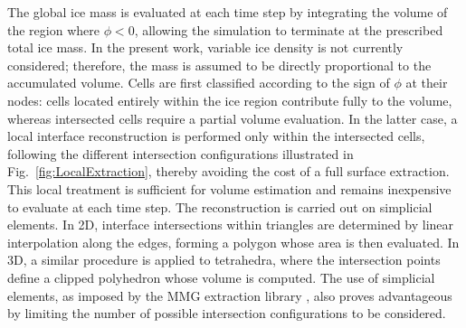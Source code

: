 The global ice mass is evaluated at each time step by integrating the volume of the region where $\phi < 0$, allowing the simulation to terminate at the prescribed total ice mass. In the present work, variable ice density is not currently considered; therefore, the mass is assumed to be directly proportional to the accumulated volume. Cells are first classified according to the sign of $\phi$ at their nodes: cells located entirely within the ice region contribute fully to the volume, whereas intersected cells require a partial volume evaluation. In the latter case, a local interface reconstruction is performed only within the intersected cells, following the different intersection configurations illustrated in Fig.~\ref{fig:LocalExtraction}, thereby avoiding the cost of a full surface extraction. This local treatment is sufficient for volume estimation and remains inexpensive to evaluate at each time step. The reconstruction is carried out on simplicial elements. In 2D, interface intersections within triangles are determined by linear interpolation along the edges, forming a polygon whose area is then evaluated. In 3D, a similar procedure is applied to tetrahedra, where the intersection points define a clipped polyhedron whose volume is computed. The use of simplicial elements, as imposed by the \textsc{MMG} extraction library \cite{DAPOGNY2014358}, also proves advantageous by limiting the number of possible intersection configurations to be considered.


